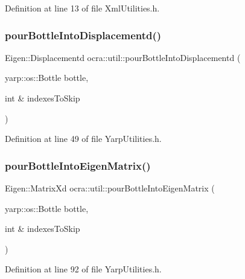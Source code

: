 Definition at line 13 of file Xml\+Utilities.\+h.

\hypertarget{namespaceocra_1_1util_a39b8fa7b650ca10472587a7cf02ef5bf}{}\label{namespaceocra_1_1util_a39b8fa7b650ca10472587a7cf02ef5bf} 
\subsubsection{\texorpdfstring{pour\+Bottle\+Into\+Displacementd()}{pourBottleIntoDisplacementd()}}
{\footnotesize\ttfamily Eigen\+::\+Displacementd ocra\+::util\+::pour\+Bottle\+Into\+Displacementd (\begin{DoxyParamCaption}\item[{yarp\+::os\+::\+Bottle}]{bottle,  }\item[{int \&}]{indexes\+To\+Skip }\end{DoxyParamCaption})\hspace{0.3cm}{\ttfamily [inline]}}



Definition at line 49 of file Yarp\+Utilities.\+h.

\hypertarget{namespaceocra_1_1util_ac8a4000b730a87cee5e5806134090be4}{}\label{namespaceocra_1_1util_ac8a4000b730a87cee5e5806134090be4} 
\subsubsection{\texorpdfstring{pour\+Bottle\+Into\+Eigen\+Matrix()}{pourBottleIntoEigenMatrix()}}
{\footnotesize\ttfamily Eigen\+::\+Matrix\+Xd ocra\+::util\+::pour\+Bottle\+Into\+Eigen\+Matrix (\begin{DoxyParamCaption}\item[{yarp\+::os\+::\+Bottle}]{bottle,  }\item[{int \&}]{indexes\+To\+Skip }\end{DoxyParamCaption})\hspace{0.3cm}{\ttfamily [inline]}}



Definition at line 92 of file Yarp\+Utilities.\+h.

\hypertarget{namespaceocra_1_1util_a3fd47a8322cedd8f4e6417af69c1b350}{}\label{namespaceocra_1_1util_a3fd47a8322cedd8f4e6417af69c1b350} 
